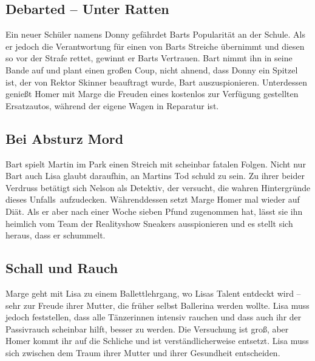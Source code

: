 \subsection{Debarted -- Unter Ratten}
Ein neuer Schüler namens Donny gefährdet Barts Popularität an der Schule. Als er jedoch die Verantwortung für einen von Barts Streiche übernimmt und diesen so vor der Strafe rettet, gewinnt er Barts Vertrauen. Bart nimmt ihn in seine Bande auf und plant einen großen Coup, nicht ahnend, dass Donny ein Spitzel ist, der von Rektor Skinner beauftragt wurde, Bart auszuspionieren. Unterdessen genießt Homer mit Marge die Freuden eines kostenlos zur Verfügung gestellten Ersatzautos, während der eigene Wagen in Reparatur ist. 


\subsection{Bei Absturz Mord}
Bart spielt Martin im Park einen Streich mit scheinbar fatalen Folgen. Nicht nur Bart auch Lisa glaubt daraufhin, an Martins Tod schuld zu sein. Zu ihrer beider Verdruss betätigt sich Nelson als Detektiv, der versucht, die wahren Hintergründe dieses \glqq Unfalls\grqq\ aufzudecken. Währenddessen setzt Marge Homer mal wieder auf Diät. Als er aber nach einer Woche sieben Pfund zugenommen hat, lässt sie ihn heimlich vom Team der Realityshow Sneakers ausspionieren und es stellt sich heraus, dass er schummelt.


\subsection{Schall und Rauch}\label{KABF08}
Marge geht mit Lisa zu einem Ballettlehrgang, wo Lisas Talent entdeckt wird -- sehr zur Freude ihrer Mutter, die früher selbst Ballerina werden wollte. Lisa muss jedoch feststellen, dass alle Tänzerinnen intensiv rauchen und dass auch ihr der Passivrauch scheinbar hilft, besser zu werden. Die Versuchung ist groß, aber Homer kommt ihr auf die Schliche und ist verständlicherweise entsetzt. Lisa muss sich zwischen dem Traum ihrer Mutter und ihrer Gesundheit entscheiden. 

